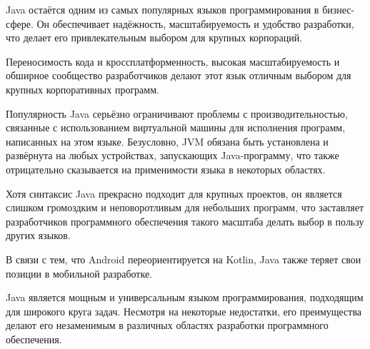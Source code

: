 Java остаётся одним из самых популярных языков программирования в бизнес-сфере. Он обеспечивает надёжность, масштабируемость и удобство разработки, что делает его привлекательным выбором для крупных корпораций.

Переносимость кода и кроссплатформенность, высокая масштабируемость и обширное сообщество разработчиков делают этот язык отличным выбором для крупных корпоративных программ.

Популярность Java серьёзно ограничивают проблемы с производительностью, связанные с использованием виртуальной машины для исполнения программ, написанных на этом языке. Безусловно, JVM обязана быть установлена и развёрнута на любых устройствах, запускающих Java-программу, что также отрицательно сказывается на применимости языка в некоторых областях.

Хотя синтаксис Java прекрасно подходит для крупных проектов, он является слишком громоздким и неповоротливым для небольших программ, что заставляет разработчиков программного обеспечения такого масштаба делать выбор в пользу других языков.

В связи с тем, что Android переориентируется на Kotlin, Java также теряет свои позиции в мобильной разработке.

Java является мощным и универсальным языком программирования, подходящим для широкого круга задач. Несмотря на некоторые недостатки, его преимущества делают его незаменимым в различных областях разработки программного обеспечения.